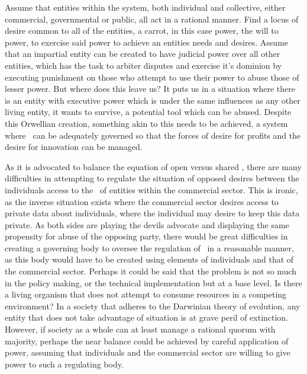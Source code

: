 Assume that entities within the system, both individual and collective, either commercial, governmental or public, all act in a rational manner. Find a locus of desire common to all of the entities, a carrot, in this case power, the will to power, to exercise said power to achieve an entities needs and desires. Assume that an impartial entity can be created to have judicial power over all other entities, which has the task to arbiter disputes and exercise it's dominion by executing punishment on those who attempt to use their power to abuse those of lesser power. But where does this leave us? It puts us in a situation where there is an entity with executive power which is under the same influences as any other living entity, it wants to survive, a potential tool which can be abused. Despite this Orwellian creation, something akin to this needs to be achieved, a system where \IP\ can be adequately governed so that the forces of desire for profits and the desire for innovation can be managed.

As it is advocated to balance the equation of open versus shared \IP, there are many difficulties in attempting to regulate the situation of opposed desires between the individuals access to the \IP\ of entities within the commercial sector. This is ironic, as the inverse situation exists where the commercial sector desires access to private data about individuals, where the individual may desire to keep this data private. As both sides are playing the devils advocate and displaying the same propensity for abuse of the opposing party, there would be great difficulties in creating a governing body to oversee the regulation of \IP\ in a reasonable manner, as this body would have to be created using elements of individuals and that of the commercial sector. Perhaps it could be said that the problem is not so much in the policy making, or the technical implementation but at a base level. Is there a living organism that does not attempt to consume resources in a competing environment? In a society that adheres to the Darwinian theory of evolution, any entity that does not take advantage of situation is at grave peril of extinction. However, if society as a whole can at least manage a rational quorum with majority, perhaps the near balance could be achieved by careful application of power, assuming that individuals and the commercial sector are willing to give power to such a regulating body.


\nocite{*}   %

\bye
